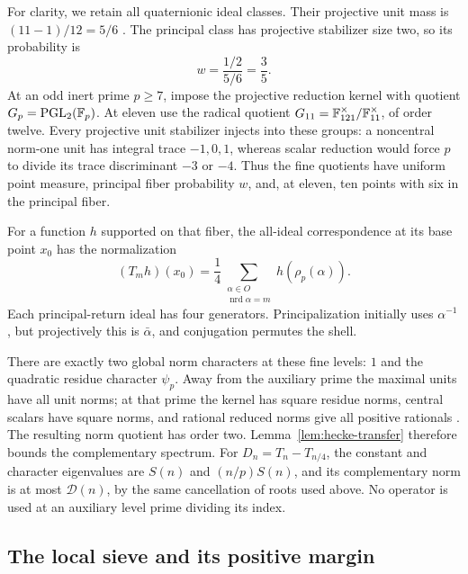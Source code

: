 For clarity, we retain all quaternionic ideal classes.  Their
projective unit mass is $(11-1)/12=5/6$
\cite[Theorem~25.1.1]{Voight}.  The principal class has projective
stabilizer size two, so its probability is
\begin{equation}\label{eq:11-mass}
                            w=\frac{1/2}{5/6}=\frac35.
\end{equation}
At an odd inert prime $p\ge7$, impose the projective reduction kernel
with quotient $G_p=\mathrm{PGL}_2(\mathbb F_p)$.  At eleven use the radical
quotient $G_{11}=\mathbb F_{121}^\times/\mathbb F_{11}^\times$, of order twelve.
Every projective unit stabilizer injects into these groups: a
noncentral norm-one unit has integral trace $-1,0,1$, whereas scalar
reduction would force $p$ to divide its trace discriminant $-3$ or
$-4$.  Thus the fine quotients have uniform point measure, principal
fiber probability $w$, and, at eleven, ten points with six in the
principal fiber.

For a function $h$ supported on that fiber, the all-ideal correspondence
at its base point $x_0$ has the normalization
\begin{equation}\label{eq:11-return}
 (T_mh)(x_0)=\frac14
      \sum_{\substack{\alpha\in O\\\operatorname{nrd}\alpha=m}}
                                  h(\rho_p(\alpha)).
\end{equation}
Each principal-return ideal has four generators.  Principalization
initially uses $\alpha^{-1}$, but projectively this is $\bar\alpha$,
and conjugation permutes the shell.

There are exactly two global norm characters at these fine levels:
$1$ and the quadratic residue character $\psi_p$.  Away from the
auxiliary prime the maximal units have all unit norms; at that prime
the kernel has square residue norms, central scalars have square norms,
and rational reduced norms give all positive rationals
\cite[Main Theorem~14.7.4]{Voight}.  The resulting norm quotient has
order two.  Lemma~\ref{lem:hecke-transfer} therefore bounds the
complementary spectrum.  For $D_n=T_n-T_{n/4}$, the constant and
character eigenvalues are $S(n)$ and $(n/p)S(n)$, and its complementary
norm is at most $\mathcal D(n)$, by the same cancellation of roots
used above.  No operator is used at an auxiliary level prime dividing
its index.

\subsection{The local sieve and its positive margin}

